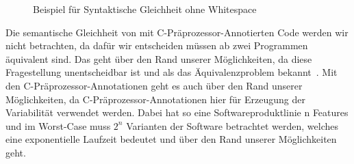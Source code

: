 \begin{figure}[H]
	\caption{Beispiel für Syntaktische Gleichheit ohne Whitespace }
\end{figure}

Die semantische Gleichheit von mit C-Präprozessor-Annotierten Code werden wir nicht betrachten, da dafür wir entscheiden müssen ab zwei Programmen äquivalent sind. Das geht über den Rand unserer Möglichkeiten, da diese Fragestellung unentscheidbar ist und als das Äquivalenzproblem bekannt~\cite{Fischer1972}. Mit den C-Präprozessor-Annotationen geht es auch über den Rand unserer Möglichkeiten, da C-Präprozessor-Annotationen hier für Erzeugung der Variabilität verwendet werden. Dabei hat so eine Softwareproduktlinie n Features und im Worst-Case muss $2^n$ Varianten der Software betrachtet werden\cite{ABKS13}, welches eine exponentielle Laufzeit bedeutet und über den Rand unserer Möglichkeiten geht.\\




